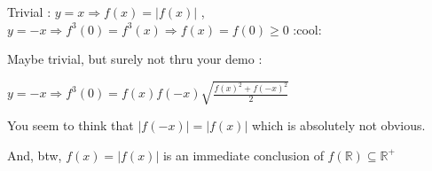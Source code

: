 \begin{solution}
	\begin{tcolorbox}Trivial : $ y = x \Longrightarrow f(x) = |f(x)|$ , $ y = - x\Longrightarrow f^3(0) = f^3(x)\Longrightarrow f(x) = f(0) \geq 0$
:cool:\end{tcolorbox}

Maybe trivial, but surely not thru your demo :

$ y = - x\Longrightarrow f^3(0) = f(x)f(-x)\sqrt{\frac{f(x)^2+f(-x)^2}{2}}$

You seem to think that $ |f(-x)|=|f(x)|$ which is absolutely not obvious.

And, btw, $ f(x) = |f(x)|$ is an immediate conclusion of $ f(\mathbb{R})\subseteq\mathbb{R}^+$
\end{solution}



